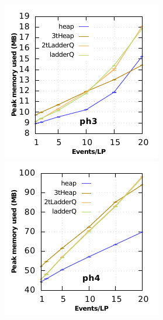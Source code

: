 \begin{figure}[H]
\begin{minipage}{0.32\linewidth}
\includegraphics[width=\linewidth]{images/ph3_memory}
\end{minipage}
\begin{minipage}{0.32\linewidth}
\includegraphics[width=\linewidth]{images/ph4_memory}

\end{minipage}
\end{figure}
